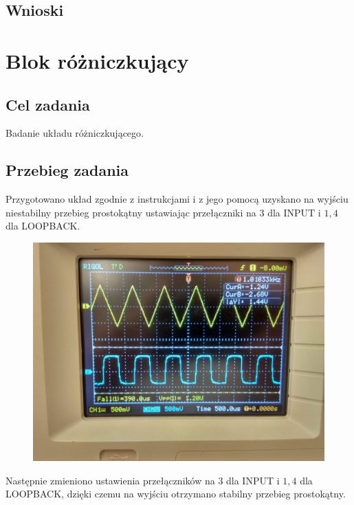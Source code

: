 \documentclass[polish,polish,a4paper]{article}
\begin{document}
\begin{spacing}{1.3}
\subsection{Wnioski}

\section{Blok różniczkujący} %

\subsection{Cel zadania}

Badanie układu różniczkującego.

\subsection{Przebieg zadania}

Przygotowano układ zgodnie z instrukcjami i z jego pomocą uzyskano na wyjściu niestabilny przebieg prostokątny ustawiając przełączniki na $3$ dla INPUT i $1,4$ dla LOOPBACK.

\begin{figure}[H]
	\centering
	\includegraphics[scale=0.1]{1611.jpg}
\end{figure}

Następnie zmieniono ustawienia przełączników na $3$ dla INPUT i $1,4$ dla LOOPBACK, dzięki czemu na  wyjściu otrzymano stabilny przebieg prostokątny.


\end{spacing}
\end{document}
